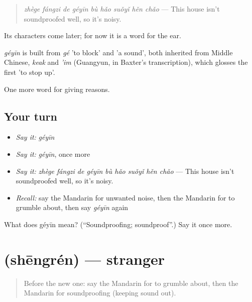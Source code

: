 \begin{quote}
\emph{zhège fángzi de géyīn bù hǎo suǒyǐ hěn chǎo} — This house isn't soundproofed well, so it's noisy.
\end{quote}

Its characters come later; for now it is a word for the ear.

\begin{cousinweb}
\emph{géyīn} is built from \emph{gé} 'to block' and  'a sound', both inherited from Middle Chinese, \emph{keak} and \emph{'im} (Guangyun, in Baxter's transcription), which glosses the first 'to stop up'.
\end{cousinweb}

\begin{grammarlens}[title={What you've built}]
One more word for giving reasons.
\end{grammarlens}

\subsection*{Your turn}
\begin{itemize}
\raggedright
  \item \emph{Say it:} \emph{géyīn}
  \item \emph{Say it:} \emph{géyīn}, once more
  \item \emph{Say it:} \emph{zhège fángzi de géyīn bù hǎo suǒyǐ hěn chǎo} — This house isn't soundproofed well, so it's noisy.
  \item \emph{Recall:} say the Mandarin for unwanted noise, then the Mandarin for to grumble about, then say \emph{géyīn} again
\end{itemize}

\begin{tcolorbox}[breakable,colback=teal!4,colframe=teal!35!black,title={Before you move on}]
What does géyīn mean? (\textquotedblleft{}Soundproofing; soundproof\textquotedblright{}.) Say it once more.
\end{tcolorbox}
\section[\texorpdfstring{\zh{生人} (shēngrén)}{生人 (shēngrén)}]{ (shēngrén) — stranger}

\label{lesson:ZH-C378-shengren}



\begin{quote}
Before the new one: say the Mandarin for to grumble about, then the Mandarin for soundproofing (keeping sound out).
\end{quote}

